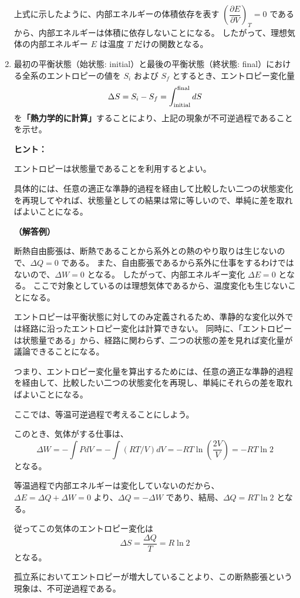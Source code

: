 \documentclass[uplatex,dvipdfmx,a4paper,11pt]{jsarticle}
\begin{document}
\begin{enumerate}
上式に示したように、内部エネルギーの体積依存を表す $\left(\dfrac{\partial E}{\partial V} \right)_T = 0$ であるから、内部エネルギーは体積に依存しないことになる。
したがって、理想気体の内部エネルギー $E$ は温度 $T$ だけの関数となる。

\newpage

\item
\label{part: ref1}
最初の平衡状態（始状態: initial）と最後の平衡状態（終状態: final）における全系のエントロピーの値を $S_{i}$ および $S_{f}$ とするとき、エントロピー変化量
\begin{equation}
\Delta S = S_{i} - S_{f} = \int_{\rm initial}^{\rm final} dS
\end{equation}
を{\bf 「熱力学的に計算」}することにより、上記の現象が不可逆過程であることを示せ。
\vspace{8pt}

\begin{itembox}[l]{{\bf ヒント：}}

エントロピーは状態量であることを利用するとよい。

具体的には、任意の適正な準静的過程を経由して比較したい二つの状態変化を再現してやれば、状態量としての結果は常に等しいので、単純に差を取ればよいことになる。

\end{itembox}

{\bf （解答例）}

断熱自由膨張は、断熱であることから系外との熱のやり取りは生じないので、$\Delta Q = 0$ である。
また、自由膨張であるから系外に仕事をするわけではないので、$\Delta W = 0$ となる。
したがって、内部エネルギー変化 $\Delta E = 0$ となる。
ここで対象としているのは理想気体であるから、温度変化も生じないことになる。

エントロピーは平衡状態に対してのみ定義されるため、準静的な変化以外では経路に沿ったエントロピー変化は計算できない。
同時に、「エントロピーは状態量である」から、経路に関わらず、二つの状態の差を見れば変化量が議論できることになる。

つまり、エントロピー変化量を算出するためには、任意の適正な準静的過程を経由して、比較したい二つの状態変化を再現し、単純にそれらの差を取ればよいことになる。

ここでは、等温可逆過程で考えることにしよう。

このとき、気体がする仕事は、
\begin{equation*}
\Delta W = -\int PdV = -\int (RT/V) dV = -RT \ln \left(\dfrac{2V}{V} \right) = -RT \ln 2
\end{equation*}
となる。

等温過程で内部エネルギーは変化していないのだから、$\Delta E = \Delta Q+ \Delta W =0$ より、$\Delta Q=-\Delta W$ であり、結局、$\Delta Q = RT \ln 2$ となる。

従ってこの気体のエントロピー変化は
\begin{equation*}
\Delta S= \dfrac{\Delta Q}{T} = R \ln 2
\end{equation*}
となる。

孤立系においてエントロピーが増大していることより、この断熱膨張という現象は、不可逆過程である。

\color{black}

\end{enumerate}
\end{document}
